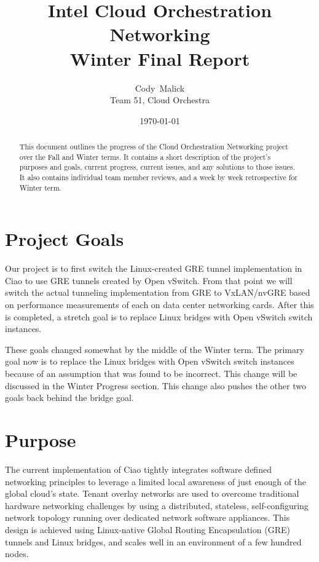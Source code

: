 \documentclass[10pt,onecolumn,journal,draftclsnofoot]{IEEEtran}
\begin{document}
\begin{titlepage}
	\title{Intel Cloud Orchestration Networking\\ Winter Final Report}
	\author{Cody~Malick\\
		Team 51, Cloud Orchestra}
	\date{\today}
	\maketitle
	\vspace{4cm}
	\begin{abstract}
		\noindent This document outlines the progress of the Cloud
		Orchestration Networking project over the Fall and Winter
		terms. It contains a short description of the project's purposes
		and goals, current progress, current issues, and any solutions
		to those issues. It also contains individual team member reviews,
		and a week by week retrospective for Winter term. \end{abstract}

\end{titlepage}
\tableofcontents
\clearpage

\section{Project Goals}

Our project is to first switch the Linux-created GRE tunnel implementation in
Ciao to use GRE tunnels created by Open vSwitch. From that point we will switch
the actual tunneling implementation from GRE to VxLAN/nvGRE based on performance
measurements of each on data center networking cards. After this is completed, a
stretch goal is to replace Linux bridges with Open vSwitch switch instances.

These goals changed somewhat by the middle of the Winter term. The primary goal
now is to replace the Linux bridges with Open vSwitch switch instances because
of an assumption that was found to be incorrect. This change will be discussed
in the Winter Progress section. This change also pushes the other two goals back
behind the bridge goal.

\section{Purpose}

The current implementation of Ciao tightly integrates software defined
networking principles to leverage a limited local awareness of just enough of
the global cloud's state. Tenant overlay networks are used to overcome
traditional hardware networking challenges by using a distributed, stateless,
self-configuring network topology running over dedicated network software
appliances. This design is achieved using Linux-native Global Routing
Encapsulation (GRE) tunnels and Linux bridges, and scales well in an environment
of a few hundred nodes.
\end{document}
